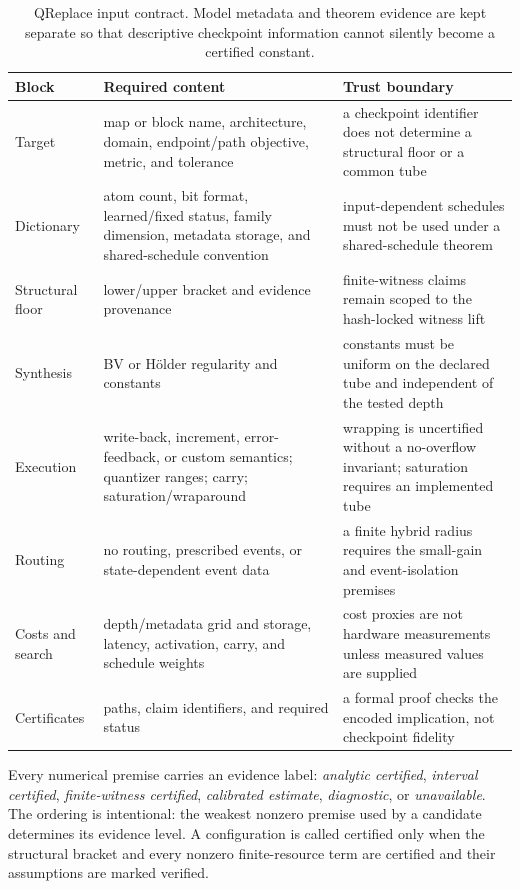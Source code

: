 \documentclass[twoside,11pt]{article}
\begin{document}
\begin{table}[ht]
\centering
\caption{QReplace input contract.  Model metadata and theorem evidence are
kept separate so that descriptive checkpoint information cannot silently
become a certified constant.}
\label{tab:qreplace-schema}
\small
\begin{tabularx}{\linewidth}{@{}Y{.18\linewidth}Y{.31\linewidth}X@{}}
\toprule
Block & Required content & Trust boundary\\
\midrule
Target & map or block name, architecture, domain, endpoint/path objective,
metric, and tolerance & a checkpoint identifier does not determine a
structural floor or a common tube\\
Dictionary & atom count, bit format, learned/fixed status, family dimension,
metadata storage, and shared-schedule convention & input-dependent schedules
must not be used under a shared-schedule theorem\\
Structural floor & lower/upper bracket and evidence provenance & finite-witness
claims remain scoped to the hash-locked witness lift\\
Synthesis & BV or H\"older regularity and constants & constants must be uniform
on the declared tube and independent of the tested depth\\
Execution & write-back, increment, error-feedback, or custom semantics;
quantizer ranges; carry; saturation/wraparound & wrapping is uncertified
without a no-overflow invariant; saturation requires an implemented tube\\
Routing & no routing, prescribed events, or state-dependent event data & a
finite hybrid radius requires the small-gain and event-isolation premises\\
Costs and search & depth/metadata grid and storage, latency, activation, carry,
and schedule weights & cost proxies are not hardware measurements unless
measured values are supplied\\
Certificates & paths, claim identifiers, and required status & a formal proof
checks the encoded implication, not checkpoint fidelity\\
\bottomrule
\end{tabularx}
\end{table}

Every numerical premise carries an evidence label:
\emph{analytic certified}, \emph{interval certified}, \emph{finite-witness
certified}, \emph{calibrated estimate}, \emph{diagnostic}, or
\emph{unavailable}.  The ordering is intentional: the weakest nonzero premise
used by a candidate determines its evidence level.  A configuration is called
certified only when the structural bracket and every nonzero finite-resource
term are certified and their assumptions are marked verified.
\end{document}
